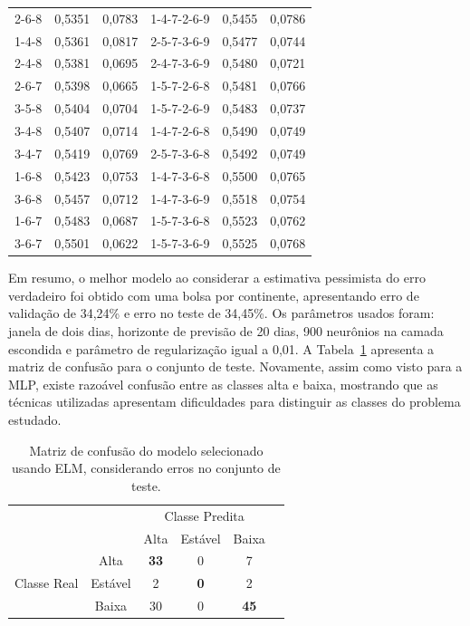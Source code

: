 \documentclass[12pt,a4paper,utf8]{ppgsi}
\begin{document}
\begin{table}[htb]
\begin{tabular}{|ccc||ccc|}
    2-6-8   &   0,5351  &   0,0783  &   1-4-7-2-6-9 &   0,5455  &   0,0786  \\
    1-4-8   &   0,5361  &   0,0817  &   2-5-7-3-6-9 &   0,5477  &   0,0744  \\
    2-4-8   &   0,5381  &   0,0695  &   2-4-7-3-6-9 &   0,5480  &   0,0721  \\
    2-6-7   &   0,5398  &   0,0665  &   1-5-7-2-6-8 &   0,5481  &   0,0766  \\
    3-5-8   &   0,5404  &   0,0704  &   1-5-7-2-6-9 &   0,5483  &   0,0737  \\
    3-4-8   &   0,5407  &   0,0714  &   1-4-7-2-6-8 &   0,5490  &   0,0749  \\
    3-4-7   &   0,5419  &   0,0769  &   2-5-7-3-6-8 &   0,5492  &   0,0749  \\
    1-6-8   &   0,5423  &   0,0753  &   1-4-7-3-6-8 &   0,5500  &   0,0765  \\
    3-6-8   &   0,5457  &   0,0712  &   1-4-7-3-6-9 &   0,5518  &   0,0754  \\
    1-6-7   &   0,5483  &   0,0687  &   1-5-7-3-6-8 &   0,5523  &   0,0762  \\
    3-6-7   &   0,5501  &   0,0622  &   1-5-7-3-6-9 &   0,5525  &   0,0768  \\

    \hline
    \end{tabular}
    \end{table}

    Em resumo, o melhor modelo ao considerar a estimativa pessimista do erro verdadeiro foi obtido com uma bolsa por continente, apresentando erro de validação de 34,24\% e erro no teste de 34,45\%. Os parâmetros usados foram: janela de dois dias, horizonte de previsão de 20 dias, 900 neurônios na camada escondida e parâmetro de regularização igual a 0,01. A Tabela~\ref{tab:confusao-elm} apresenta a matriz de confusão para o conjunto de teste. Novamente, assim como visto para a MLP, existe razoável confusão entre as classes alta e baixa, mostrando que as técnicas utilizadas apresentam dificuldades para distinguir as classes do problema estudado.

    \begin{table}[htb]
    \caption{Matriz de confusão do modelo selecionado usando ELM, considerando erros no conjunto de teste.}
    \label{tab:confusao-elm}
    \centering
    \begin{tabular}{cccccc}
                                &   & \multicolumn{3}{c}{Classe Predita} \\
                                &   & Alta  & Estável   & Baixa     \\
    \multirow{3}{*}{Classe Real}& Alta & \textbf{33}    & 0     & 7 \\
                                & Estável & 2   & \textbf{0}    & 2     \\
                                & Baixa & 30    & 0 & \textbf{45}       \\

    \end{tabular}
    \end{table}
\end{document}
